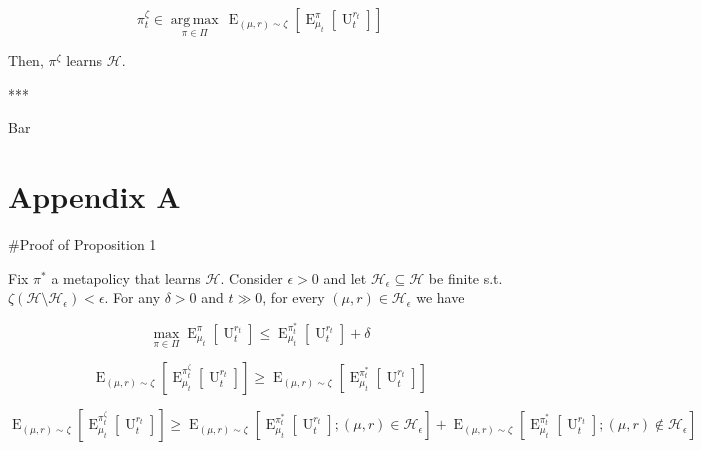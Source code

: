 \documentclass[a4paper]{article}
\DeclareMathOperator{\E}{E}
\newcommand{\Argmax}[1]{\underset{#1}{\operatorname{arg\,max}}\,}
\newcommand{\Hy}{\mathcal{H}}
\newcommand{\Ut}{\operatorname{U}}
\begin{document}
$$\pi^\zeta_t \in \Argmax{\pi \in \Pi} \E_{(\mu,r) \sim \zeta}[\E_{\mu_t}^{\pi}[\Ut_t^{r_t}]]$$

Then, $\pi^\zeta$ learns $\Hy$.

***

Bar

\section{Appendix A}

\#Proof of Proposition 1

Fix $\pi^*$ a metapolicy that learns $\Hy$. Consider $\epsilon > 0$ and let $\Hy_\epsilon \subseteq \Hy$ be finite s.t. $\zeta(\Hy \setminus \Hy_\epsilon) < \epsilon$. For any $\delta > 0$ and $t \gg 0$, for every $(\mu,r) \in \Hy_\epsilon$ we have

$$\max_{\pi \in \Pi} \E_{\mu_t}^{\pi}[\Ut_t^{r_t}] \leq \E_{\mu_t}^{\pi^*_t}[\Ut_t^{r_t}] + \delta$$

$$\E_{(\mu,r) \sim \zeta}[\E_{\mu_t}^{\pi^\zeta_t}[\Ut_t^{r_t}]] \geq \E_{(\mu,r) \sim \zeta}[\E_{\mu_t}^{\pi^*_t}[\Ut_t^{r_t}]]$$

$$\E_{(\mu,r) \sim \zeta}[\E_{\mu_t}^{\pi^\zeta_t}[\Ut_t^{r_t}]] \geq \E_{(\mu,r) \sim \zeta}[\E_{\mu_t}^{\pi^*_t}[\Ut_t^{r_t}]; (\mu,r) \in \Hy_\epsilon] + \E_{(\mu,r) \sim \zeta}[\E_{\mu_t}^{\pi^*_t}[\Ut_t^{r_t}]; (\mu,r) \not\in \Hy_\epsilon]$$
\end{document}
